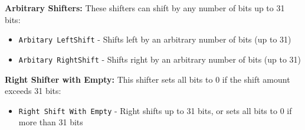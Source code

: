 \documentclass[a4paper,12pt]{article}
\begin{document}
    \item\textbf{Arbitrary Shifters:} These shifters can shift by any number of bits up to 31 bits:
        \begin{itemize}
            \item \texttt{Arbitary LeftShift} - Shifts left by an arbitrary number of bits (up to 31)
            \item \texttt{Arbitary RightShift} - Shifts right by an arbitrary number of bits (up to 31)
        \end{itemize}
    
    \item\textbf{Right Shifter with Empty:} This shifter sets all bits to 0 if the shift amount exceeds 31 bits:
        \begin{itemize}
            \item \texttt{Right Shift With Empty} - Right shifts up to 31 bits, or sets all bits to 0 if more than 31 bits
        \end{itemize}

        
\end{document}
